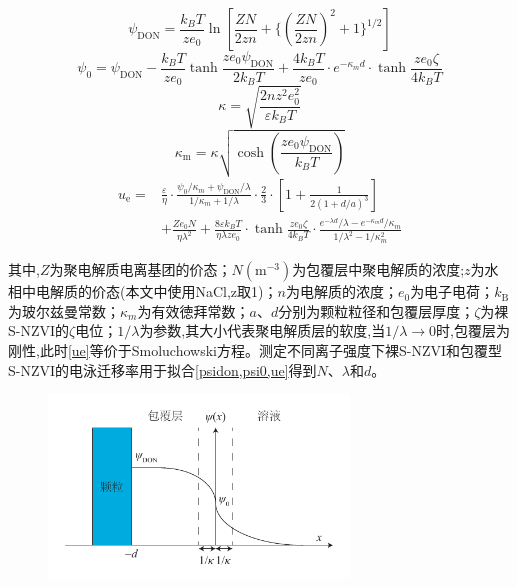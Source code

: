 \begin{equation}\label{psidon}
    \psi _\mathrm{DON}=\frac{k_BT}{ze_0}\ln[\frac{ZN}{2zn}+\{(\frac{ZN}{2zn})^2+1\}^{1/2}]
\end{equation}
\begin{equation}\label{psi0}
    \psi_0=\psi_\mathrm{DON}-\frac{k_BT}{ze_0}\tanh\frac{ze_0\psi_\mathrm{DON}}{2k_BT}+\frac{4k_BT}{ze_0}\cdot e^{-\kappa_md}\cdot\tanh\frac{ze_0\zeta }{4k_BT}
\end{equation}
\begin{equation}
    \kappa=\sqrt{\frac{2nz^2e_0^2}{\varepsilon k_B T}}
\end{equation}
\begin{equation}
    \kappa_\mathrm{m}=\kappa\sqrt{\cosh(\frac{ze_0\psi_\mathrm{DON}}{k_BT})}
\end{equation}
\begin{align}\label{ue}
    u_\mathrm{e}=&\frac{\varepsilon}{\eta }\cdot\frac{\psi _0/\kappa _m+\psi _\mathrm{DON}/\lambda }{1/\kappa _m+1/\lambda }\cdot\frac{2}{3}\cdot[1+\frac{1}{2(1+d/a)^3}]\\ &+\frac{Ze_0N}{\eta \lambda ^2}+\frac{8\varepsilon k_BT}{\eta \lambda ze_0}\cdot\tanh \frac{ze_0\zeta}{4k_BT}\cdot\frac{e^{-\lambda d}/\lambda -e^{-\kappa _md}/\kappa _m}{1/\lambda ^2-1/\kappa _m^2}\nonumber
\end{align}

其中,$Z$为聚电解质电离基团的价态；$N(\mathrm{m^{-3}})$为包覆层中聚电解质的浓度;$z$为水相中电解质的价态(本文中使用NaCl,z取1)；$n$为电解质的浓度；$e_0$为电子电荷；$k_\mathrm{B}$为玻尔兹曼常数；$\kappa_m$为有效徳拜常数；$a$、$d$分别为颗粒粒径和包覆层厚度；$\zeta$为裸S-NZVI的$\zeta$电位；$1/\lambda$为参数,其大小代表聚电解质层的软度,当$1/\lambda\rightarrow 0$时,包覆层为刚性,此时\cref{ue}等价于Smoluchowski方程。测定不同离子强度下裸S-NZVI和包覆型S-NZVI的电泳迁移率用于拟合\cref{psidon,psi0,ue}得到$N$、$\lambda$和$d$。

\begin{figure}[htb]
    \centering
    \includegraphics[width=8cm]{figs/Donnan-potential.pdf}
    \label{donnan}
\end{figure}

